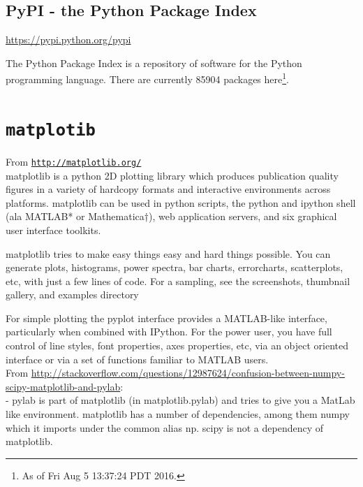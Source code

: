 \documentclass[11pt,a4paper]{article}
\begin{document}
\subsection{PyPI - the Python Package Index}
\noindent
\href{https://pypi.python.org/pypi}{https://pypi.python.org/pypi}

\noindent
The Python Package Index is a repository of software for the Python
programming language. There are currently 85904 packages
here\footnote{As of Fri Aug 5 13:37:24 PDT 2016.}.





\newpage
\section{{\tt matplotib}}
From \href{http://matplotlib.org/}{{\tt http://matplotlib.org/}} \\

\noindent
matplotlib is a python 2D plotting library which produces publication
quality figures in a variety of hardcopy formats and interactive
environments across platforms. matplotlib can be used in python
scripts, the python and ipython shell (ala MATLAB* or Mathematica†),
web application servers, and six graphical user interface toolkits.

matplotlib tries to make easy things easy and hard things
possible. You can generate plots, histograms, power spectra, bar
charts, errorcharts, scatterplots, etc, with just a few lines of
code. For a sampling, see the screenshots, thumbnail gallery, and
examples directory

For simple plotting the pyplot interface provides a MATLAB-like
interface, particularly when combined with IPython. For the power
user, you have full control of line styles, font properties, axes
properties, etc, via an object oriented interface or via a set of
functions familiar to MATLAB users.\\

\smallskip
\smallskip
\noindent
From \href{http://stackoverflow.com/questions/12987624/confusion-between-numpy-scipy-matplotlib-and-pylab}{http://stackoverflow.com/questions/12987624/confusion-between-numpy-scipy-matplotlib-and-pylab}:\\

- pylab is part of matplotlib (in matplotlib.pylab) and tries to give
you a MatLab like environment. matplotlib has a number of
dependencies, among them numpy which it imports under the common alias
np. scipy is not a dependency of matplotlib.
\end{document}
